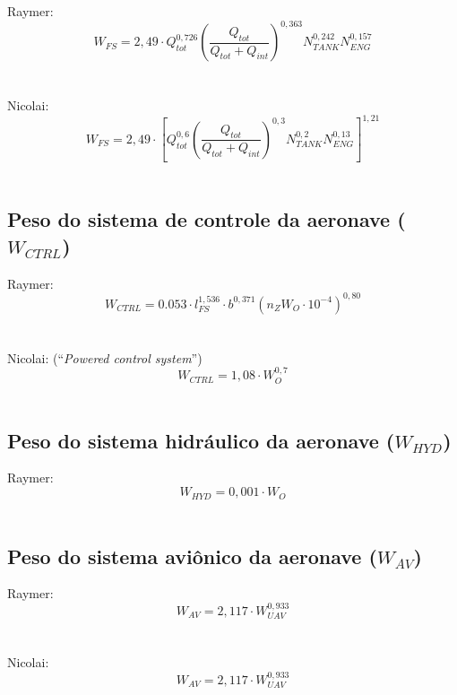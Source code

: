     Raymer:
    \begin{equation*}
    	W_{FS} = 2,49 \cdot
				Q_{tot}^{0,726}
				\left( \frac
					{ Q_{tot} }
					{ Q_{tot} + Q_{int} }
				\right) ^{0,363}
				N_{TANK}^{0,242}
				N_{ENG}^{0,157}
    \end{equation*}
		\\~\\
    Nicolai:
    \begin{equation*}
    	W_{FS} = 2,49 \cdot
				\left[
					Q_{tot}^{0,6}
					\left( \frac
						{ Q_{tot} }
						{ Q_{tot} + Q_{int} }
					\right) ^{0,3}
					N_{TANK}^{0,2}
					N_{ENG}^{0,13}
				\right] ^{1,21}
    \end{equation*}
		\\

  \subsection{Peso do sistema de controle da aeronave ($W_{CTRL}$)}

    Raymer:
    \begin{equation*}
  		W_{CTRL} =
				0.053 \cdot
				l_{FS}^{1,536} \cdot
				b^{0,371}
				\left(
					n_Z W_O \cdot 10^{-4}
				\right) ^{0,80}
    \end{equation*}
		\\~\\
    Nicolai: (``\emph{Powered control system}'')
    \begin{equation*}
  		W_{CTRL} = 1,08 \cdot W_O^{0,7}
    \end{equation*}
		\\

  \subsection{Peso do sistema hidráulico da aeronave ($W_{HYD}$)}

    Raymer:
    \begin{equation*}
  		W_{HYD} = 0,001 \cdot W_O
    \end{equation*}
		\\

  \subsection{Peso do sistema aviônico da aeronave ($W_{AV}$)}

    Raymer:
    \begin{equation*}
			W_{AV} = 2,117 \cdot W_{UAV}^{0,933}
    \end{equation*}
		\\~\\
    Nicolai:
	  \begin{equation*}
  		W_{AV} = 2,117 \cdot W_{UAV}^{0,933}
    \end{equation*}
		\\

